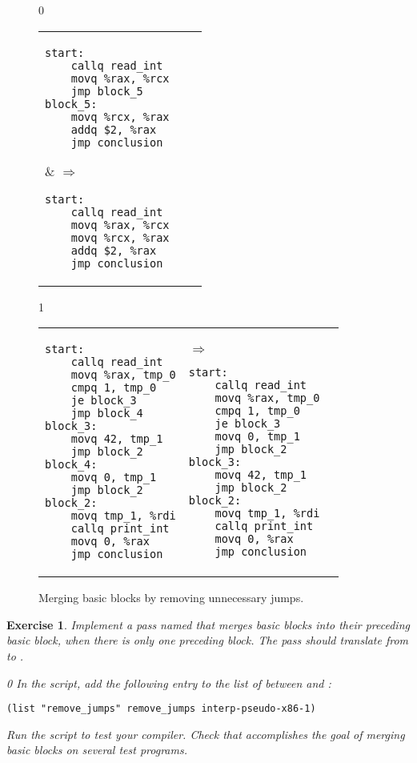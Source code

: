 \documentclass[7x10]{TimesAPriori_MIT}%
\def\racketEd{0}
\def\pythonEd{1}
\def\edition{1}
\newcommand{\pythonColor}[0]{}
\newtheorem{exercise}[theorem]{Exercise}
\numberwithin{theorem}{chapter}
\numberwithin{definition}{chapter}
\numberwithin{equation}{chapter}
\begin{document}
\begin{figure}[tbp]
\begin{tcolorbox}[colback=white]
{\if\edition\racketEd        
\begin{tabular}{lll}
\begin{minipage}{0.5\textwidth}
\begin{lstlisting}
start:
    callq read_int
    movq %rax, %rcx
    jmp block_5
block_5:
    movq %rcx, %rax
    addq $2, %rax
    jmp conclusion
\end{lstlisting}
\end{minipage}
&
$\Rightarrow\qquad$
\begin{minipage}{0.4\textwidth}
\begin{lstlisting}
start:
    callq read_int
    movq %rax, %rcx
    movq %rcx, %rax
    addq $2, %rax
    jmp conclusion
\end{lstlisting}
\end{minipage}
\end{tabular}
\fi}
{\if\edition\pythonEd\pythonColor
\begin{tabular}{lll}
\begin{minipage}{0.5\textwidth}
\begin{lstlisting}
start:
	callq read_int
	movq %rax, tmp_0
	cmpq 1, tmp_0
	je block_3
	jmp block_4
block_3:
	movq 42, tmp_1
	jmp block_2
block_4:
	movq 0, tmp_1
	jmp block_2
block_2:
	movq tmp_1, %rdi
	callq print_int
	movq 0, %rax
	jmp conclusion
\end{lstlisting}
\end{minipage}
&
$\Rightarrow\qquad$
\begin{minipage}{0.4\textwidth}
\begin{lstlisting}
start:
	callq read_int
	movq %rax, tmp_0
	cmpq 1, tmp_0
	je block_3
	movq 0, tmp_1
	jmp block_2
block_3:
	movq 42, tmp_1
	jmp block_2
block_2:
	movq tmp_1, %rdi
	callq print_int
	movq 0, %rax
	jmp conclusion
\end{lstlisting}
\end{minipage}
\end{tabular}
\fi}
\end{tcolorbox}

\caption{Merging basic blocks by removing unnecessary jumps.}
\label{fig:remove-jumps}
\end{figure}

\begin{exercise}\normalfont\normalsize
%
Implement a pass named  that merges basic blocks
into their preceding basic block, when there is only one preceding
block. The pass should translate from \LangXIfVar{} to \LangXIfVar{}.
%
{\if\edition\racketEd        
In the  script, add the following entry to the
list of  between 
and :
\begin{lstlisting}
(list "remove_jumps" remove_jumps interp-pseudo-x86-1)
\end{lstlisting}
\fi}
%
Run the script to test your compiler.
%
Check that  accomplishes the goal of merging basic
blocks on several test programs.
\end{exercise}
\end{document}

